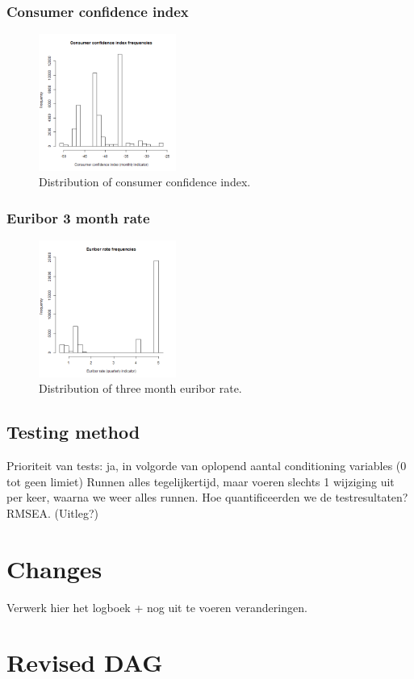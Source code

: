 \documentclass[11pt]{article}
\begin{document}
\subsubsection{Consumer confidence index}
\begin{figure}[H]
	\centering
	\includegraphics[width=0.4\textwidth]{images/consumer_confidence_index}
	\caption{Distribution of consumer confidence index.}
	\label{fig:cons_conf_idx}
\end{figure}

\subsubsection{Euribor 3 month rate}
\begin{figure}[H]
	\centering
	\includegraphics[width=0.4\textwidth]{images/euribor3m}
	\caption{Distribution of three month euribor rate.}
	\label{fig:euribor3m}
\end{figure}

\subsection{Testing method}
Prioriteit van tests: ja, in volgorde van oplopend aantal conditioning variables (0 tot geen limiet)
Runnen alles tegelijkertijd, maar voeren slechts 1 wijziging uit per keer, waarna we weer alles runnen.
Hoe quantificeerden we de testresultaten? RMSEA. (Uitleg?)

\section{Changes}
Verwerk hier het logboek + nog uit te voeren veranderingen.

\section{Revised DAG}
\end{document}

